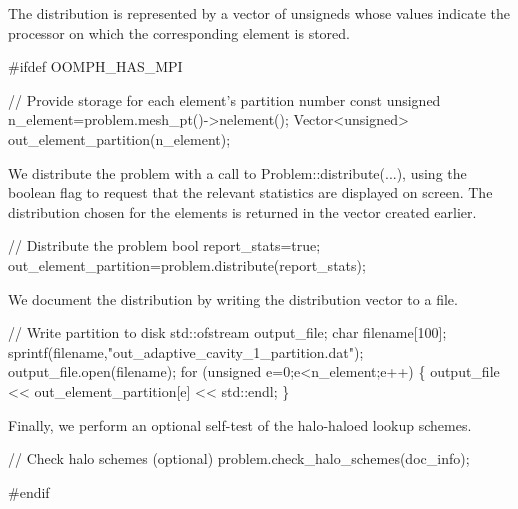 The distribution is represented by a vector of unsigneds whose values indicate the processor on which the corresponding element is stored.


\begin{DoxyCodeInclude}

\textcolor{preprocessor}{#ifdef OOMPH\_HAS\_MPI}

    \textcolor{comment}{// Provide storage for each element's partition number}
    \textcolor{keyword}{const} \textcolor{keywordtype}{unsigned} n\_element=problem.mesh\_pt()->nelement();
    Vector<unsigned> out\_element\_partition(n\_element);

\end{DoxyCodeInclude}


We distribute the problem with a call to {\ttfamily Problem\+::distribute}(...), using the boolean flag to request that the relevant statistics are displayed on screen. The distribution chosen for the elements is returned in the vector created earlier.


\begin{DoxyCodeInclude}

    \textcolor{comment}{// Distribute the problem}
    \textcolor{keywordtype}{bool} report\_stats=\textcolor{keyword}{true};
    out\_element\_partition=problem.distribute(report\_stats);

\end{DoxyCodeInclude}


We document the distribution by writing the distribution vector to a file.


\begin{DoxyCodeInclude}

    \textcolor{comment}{// Write partition to disk}
    std::ofstream output\_file;
    \textcolor{keywordtype}{char} filename[100];
    sprintf(filename,\textcolor{stringliteral}{"out\_adaptive\_cavity\_1\_partition.dat"});
    output\_file.open(filename);
    \textcolor{keywordflow}{for} (\textcolor{keywordtype}{unsigned} e=0;e<n\_element;e++)
     \{
      output\_file << out\_element\_partition[e] << std::endl;
     \}

\end{DoxyCodeInclude}


Finally, we perform an optional self-\/test of the halo-\/haloed lookup schemes.


\begin{DoxyCodeInclude}

    \textcolor{comment}{// Check halo schemes (optional)}
    problem.check\_halo\_schemes(doc\_info);

\textcolor{preprocessor}{#endif}

\end{DoxyCodeInclude}




